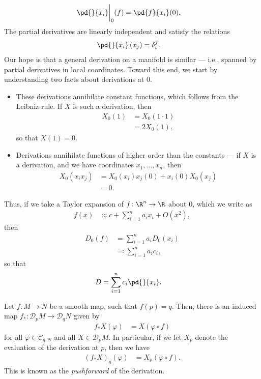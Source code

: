 \documentclass[10pt]{mypackage}
\begin{document}
\begin{align*}
  \pd{}{x_i}\biggr\vert_{0}(f) &= \pd{f}{x_i}(0).
\end{align*}
The partial derivatives are linearly independent and satisfy the relations
\begin{align*}
  \pd{}{x_i} \left( x_j \right) &= \delta_{i}^{j}.
\end{align*}
Our hope is that a general derivation on a manifold is similar --- i.e., spanned by partial derivatives in local coordinates. Toward this end, we start by understanding two facts about derivations at $0$.
\begin{itemize}
  \item These derivations annihilate constant functions, which follows from the Leibniz rule. If $X$ is such a derivation, then
    \begin{align*}
      X_0\left( 1 \right) &= X_0\left( 1\cdot 1 \right)\\
                        &= 2X_0(1),
    \end{align*}
    so that $X(1) = 0$.
  \item Derivations annihilate functions of higher order than the constants --- if $X$ is a derivation, and we have coordinates $x_1,\dots,x_n$, then
    \begin{align*}
      X_0\left( x_ix_j \right) &= X_0\left( x_i \right)x_j\left( 0 \right) + x_i(0)X_0\left( x_j \right)\\
                               &= 0.
    \end{align*}
\end{itemize}
Thus, if we take a Taylor expansion of $f\colon \R^{n}\rightarrow \R$ about $0$, which we write as
\begin{align*}
  f(x) &\approx c + \sum_{i=1}^{n}a_ix_i + O\left( x^2 \right),
\end{align*}
then
\begin{align*}
  D_0(f) &= \sum_{i=1}^{n}a_i D_0\left( x_i \right)\\
         &\eqcolon \sum_{i=1}^{n}a_ic_i,
\end{align*}
so that
\begin{align*}
  D &= \sum_{i=1}^{n}c_i \pd{}{x_i}.
\end{align*}
\begin{definition}
  Let $f\colon M\rightarrow N$ be a smooth map, such that $f(p) = q$. Then, there is an induced map $f_{\ast}\colon \mathcal{D}_pM\rightarrow \mathcal{D}_qN$ given by
  \begin{align*}
    f_{\ast}X\left( \varphi \right) &= X\left( \varphi\circ f \right)
  \end{align*}
  for all $\varphi\in \mathcal{C}_{q,N}$ and all $X\in \mathcal{D}_pM$. In particular, if we let $X_p$ denote the evaluation of the derivation at $p$, then we have
  \begin{align*}
    \left( f_{\ast}X \right)_{q}\left( \varphi \right) &= X_p\left( \varphi\circ f \right).
  \end{align*}
  This is known as the \textit{pushforward} of the derivation. 
\end{definition}
\end{document}

